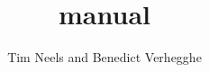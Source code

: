 \documentclass[a4paper]{manual}
\title{\pyformex manual}
\author{Tim Neels and Benedict Verhegghe}
\begin{document}
\maketitle
\begin{latexonly}
  \tableofcontents
\end{latexonly}




\appendix


\printindex%
\end{document}
